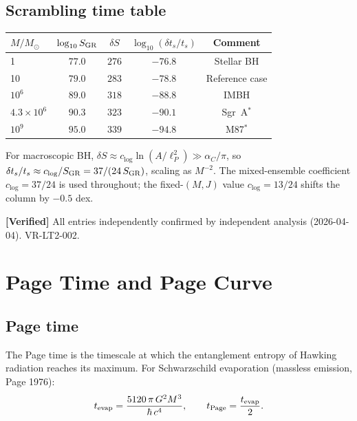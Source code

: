 \documentclass[11pt,a4paper]{article}
\theoremstyle{plain}
\theoremstyle{definition}
\newcommand{\verified}[1]{%
  \par\smallskip\noindent
  \colorbox{green!10}{\parbox{\dimexpr\linewidth-2\fboxsep}{%
    \textcolor{green!50!black}{\textbf{[Verified]}} #1}}%
  \par\smallskip}
\begin{document}
\subsection{Scrambling time table}

\begin{center}
\begin{tabular}{lcccc}
\toprule
$M/M_\odot$ & $\log_{10} S_{\rm GR}$ & $\delta S$ & $\log_{10}(\delta t_s/t_s)$ & Comment \\
\midrule
1           & $77.0$   & $276$  & $-76.8$ & Stellar BH \\
10          & $79.0$   & $283$  & $-78.8$ & Reference case \\
$10^6$      & $89.0$   & $318$  & $-88.8$ & IMBH \\
$4.3\times10^6$ & $90.3$ & $323$ & $-90.1$ & Sgr~A$^*$ \\
$10^9$      & $95.0$   & $339$  & $-94.8$ & M87$^*$ \\
\bottomrule
\end{tabular}
\end{center}

For macroscopic BH, $\delta S \approx c_{\log}\ln(A/\ell_P^2) \gg \alpha_C/\pi$,
so $\delta t_s/t_s \approx c_{\log}/S_{\rm GR} = 37/(24\,S_{\rm GR})$, scaling
as $M^{-2}$.  The mixed-ensemble coefficient $c_{\log}=37/24$ is used throughout;
the fixed-$(M,J)$ value $c_{\log}=13/24$ shifts the column by $-0.5$ dex.

\verified{All entries independently confirmed by independent analysis (2026-04-04).
  VR-LT2-002.}


\section{Page Time and Page Curve}
\label{sec:page}

\subsection{Page time}

The Page time is the timescale at which the entanglement entropy of
Hawking radiation reaches its maximum.  For Schwarzschild evaporation
(massless emission, Page 1976):
\begin{equation}
t_{\rm evap} = \frac{5120\,\pi\,G^2 M^3}{\hbar\,c^4},
\qquad
t_{\rm Page} = \frac{t_{\rm evap}}{2}.
\end{equation}
\end{document}
